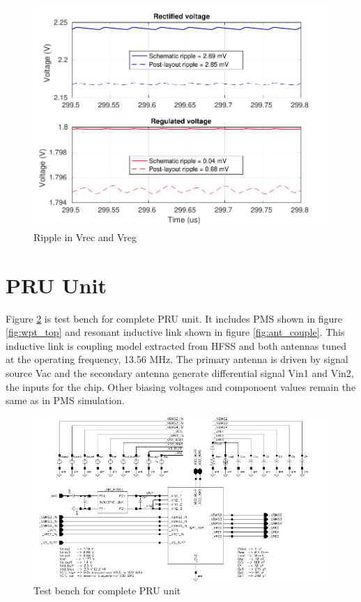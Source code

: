 \documentclass[12pt,a4paper,UKenglish]{article}
\begin{document}
\begin{figure} [H]
  \centering
  \includegraphics[width=\textwidth]{img/wpt_ripple_wo_bgr_both.pdf} 
 \caption{Ripple in Vrec and Vreg} 
\label{fig:wpt_ripple_wo} 
\end{figure}

\section{PRU Unit}

Figure \ref{fig:wpt_top_link} is test bench for complete PRU unit. It includes PMS shown in figure \ref{fig:wpt_top} and resonant inductive link shown in figure \ref{fig:ant_couple}. This inductive link is coupling model extracted from HFSS and both antennas tuned at the operating frequency, 13.56 MHz. The primary antenna is driven by signal source Vac and the secondary antenna generate differential signal Vin1 and Vin2, the inputs for the chip. Other biasing voltages and componoent values remain the same as in PMS simulation. \\

\begin{figure} [H]
  \centering
  \includegraphics[width=\textwidth]{img/wpt_top_link.pdf} 
 \caption{Test bench for complete PRU unit } 
\label{fig:wpt_top_link} 
\end{figure}
\end{document}
